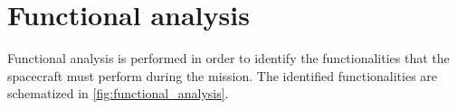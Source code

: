 \section{Functional analysis}
\label{sec:functional_analysis}

Functional analysis is performed in order to identify the functionalities that the spacecraft must perform during the mission. The identified functionalities are schematized in \autoref{fig:functional_analysis}.
\cite{curtis_book}

